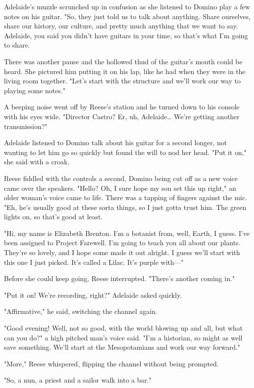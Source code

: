 Adelaide's muzzle scrunched up in confusion as she listened to Domino play a few notes on his guitar. "So, they just told us to talk about anything. Share ourselves, share our history, our culture, and pretty much anything that we want to say. Adelaide, you said you didn't have guitars in your time, so that's what I'm going to share.

There was another pause and the hollowed thud of the guitar's mouth could be heard. She pictured him putting it on his lap, like he had when they were in the living room together. "Let's start with the structure and we'll work our way to playing some notes."

A beeping noise went off by Reese's station and he turned down to his console with his eyes wide. "Director Castro? Er, uh, Adelaide\ldots{} We're getting another transmission?"

Adelaide listened to Domino talk about his guitar for a second longer, not wanting to let him go so quickly but found the will to nod her head. "Put it on," she said with a croak.

Reese fiddled with the controls a second, Domino being cut off as a new voice came over the speakers. "Hello? Oh, I sure hope my son set this up right," an older woman's voice came to life. There was a tapping of fingers against the mic. "Eh, he's usually good at these sorta things, so I just gotta trust him. The green lights on, so that's good at least.

"Hi, my name is Elizabeth Brenton. I'm a botanist from, well, Earth, I guess. I've been assigned to Project Farewell. I'm going to teach you all about our plants. They're so lovely, and I hope some made it out alright. I guess we'll start with this one I just picked. It's called a Lilac. It's purple with---"

Before she could keep going, Reese interrupted. "There's another coming in."

"Put it on! We're recording, right?" Adelaide asked quickly.

"Affirmative," he said, switching the channel again.

"Good evening! Well, not so good, with the world blowing up and all, but what can you do?" a high pitched man's voice said. "I'm a historian, so might as well save something. We'll start at the Mesopotamians and work our way forward."

"More," Reese whispered, flipping the channel without being prompted.

"So, a nun, a priest and a sailor walk into a bar."

